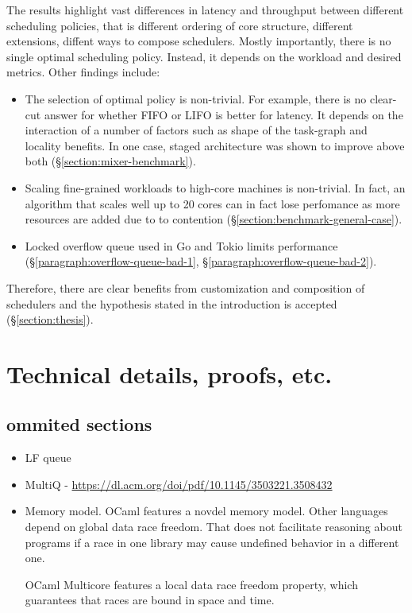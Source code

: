 \documentclass[12pt,a4paper,twoside]{report}
\begin{document}
The results highlight vast differences in latency and throughput between different scheduling policies, that is different ordering of core structure, different extensions, diffent ways to compose schedulers. Mostly importantly, there is no single optimal scheduling policy. Instead, it depends on the workload and desired metrics. Other findings include: 
\begin{itemize}
    \item The selection of optimal policy is non-trivial. For example, there is no clear-cut answer for whether FIFO or LIFO is better for latency. It depends on the interaction of a number of factors such as shape of the task-graph and locality benefits. In one case, staged architecture was shown to improve above both (\S\ref{section:mixer-benchmark}). 
    \item Scaling fine-grained workloads to high-core machines is non-trivial. In fact, an algorithm that scales well up to 20 cores can in fact lose perfomance as more resources are added due to to contention (\S\ref{section:benchmark-general-case}).
    \item Locked overflow queue used in Go and Tokio limits performance (\S\ref{paragraph:overflow-queue-bad-1}, \S\ref{paragraph:overflow-queue-bad-2}).
\end{itemize}
Therefore, there are clear benefits from customization and composition of schedulers and the hypothesis stated in the introduction is accepted (\S\ref{section:thesis}).

\label{lastcontentpage} %





\appendix


\chapter{Technical details, proofs, etc.}


\section{ommited sections}

\begin{itemize}
    \item LF queue
    \item MultiQ - \url{https://dl.acm.org/doi/pdf/10.1145/3503221.3508432}
    \item Memory model. OCaml features a novdel memory model.
    Other languages depend on global data race freedom. That does not facilitate reasoning about programs if a race in one library may cause undefined behavior in a different one. 
    
    OCaml Multicore features a local data race freedom property, which guarantees that races are bound in space and time. 
\end{itemize}



\label{lastpage}
\end{document}
